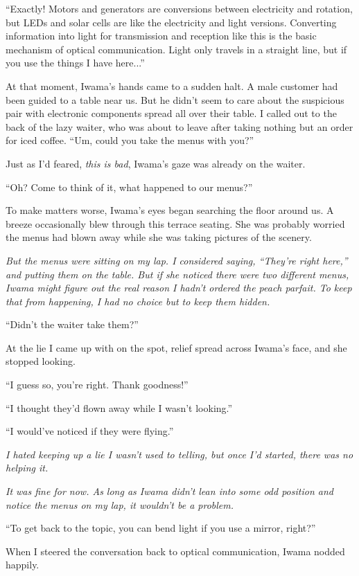 \documentclass[
    a4paper,
    12pt,
    twoside,
    openany,
    UTF8,
    fontset=windows
]{ctexbook}
\begin{document}
``Exactly! Motors and generators are conversions between electricity and rotation, but LEDs and solar cells are like the electricity and light versions. Converting information into light for transmission and reception like this is the basic mechanism of optical communication. Light only travels in a straight line, but if you use the things I have here...''

At that moment, Iwama's hands came to a sudden halt. A male customer had been guided to a table near us. But he didn't seem to care about the suspicious pair with electronic components spread all over their table. I called out to the back of the lazy waiter, who was about to leave after taking nothing but an order for iced coffee. ``Um, could you take the menus with you?''

Just as I'd feared, \textit{this is bad}, Iwama's gaze was already on the waiter.

``Oh? Come to think of it, what happened to our menus?''

To make matters worse, Iwama's eyes began searching the floor around us. A breeze occasionally blew through this terrace seating. She was probably worried the menus had blown away while she was taking pictures of the scenery.

\textit{But the menus were sitting on my lap. I considered saying, ``They're right here,'' and putting them on the table. But if she noticed there were two different menus, Iwama might figure out the real reason I hadn't ordered the peach parfait. To keep that from happening, I had no choice but to keep them hidden.}

``Didn't the waiter take them?''

At the lie I came up with on the spot, relief spread across Iwama's face, and she stopped looking.

``I guess so, you're right. Thank goodness!''

``I thought they'd flown away while I wasn't looking.''

``I would've noticed if they were flying.''

\textit{I hated keeping up a lie I wasn't used to telling, but once I'd started, there was no helping it.}

\textit{It was fine for now. As long as Iwama didn't lean into some odd position and notice the menus on my lap, it wouldn't be a problem.}

``To get back to the topic, you can bend light if you use a mirror, right?''

When I steered the conversation back to optical communication, Iwama nodded happily.
\end{document}
